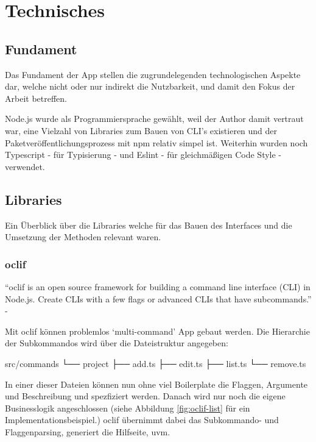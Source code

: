 \documentclass[oneside,bibliography=totocnumbered,BCOR=5mm]{scrbook}
\newenvironment{code}{\captionsetup{type=listing, skip=0pt}}{}
\begin{document}
\section{Technisches}
\subsection{Fundament}

Das Fundament der App stellen die zugrundelegenden technologischen Aspekte dar,
welche nicht oder nur indirekt die Nutzbarkeit, und damit den Fokus der Arbeit
betreffen.

\smallskip

Node.js wurde als Programmiersprache gewählt, weil der Author damit vertraut
war, eine Vielzahl von Libraries zum Bauen von CLI's existieren und der
Paketveröffentlichungsprozess mit npm relativ simpel ist. Weiterhin wurden noch
Typescript - für Typisierung - und Eslint - für gleichmäßigen Code Style -
verwendet.

\subsection{Libraries}

Ein Überblick über die Libraries welche für das Bauen des Interfaces und die
Umsetzung der Methoden relevant waren.

\subsubsection{oclif}
\label{sec:oclif}

``oclif is an open source framework for building a command line interface
(CLI) in Node.js. Create CLIs with a few flags or advanced CLIs that have
subcommands.'' - \textcite{oclif}

\medskip

Mit oclif können problemlos `multi-command' App gebaut werden. Die Hierarchie
der Subkommandos wird über die Dateistruktur angegeben:

\begin{code}
  \begin{shellcode}
 src/commands
 └── project
     ├── add.ts
     ├── edit.ts
     ├── list.ts
     └── remove.ts
  \end{shellcode}
  \medskip
\end{code}

In einer dieser Dateien können nun ohne viel Boilerplate die Flaggen,
Argumente und Beschreibung und spezfiziert werden. Danach wird nur noch die
eigene Businesslogik angeschlossen (siehe Abbildung \ref{fig:oclif-list} für
ein Implementationsbeispiel.) oclif übernimmt dabei das Subkommando- und
Flaggenparsing, generiert die Hilfseite, uvm.
\end{document}
